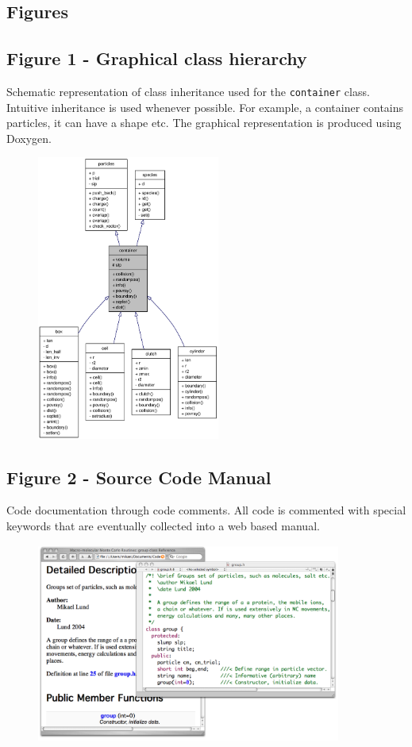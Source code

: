 \documentclass[10pt]{bmc_article}
\newenvironment{bmcformat}{\begin{raggedright}\baselineskip20pt\sloppy\setboolean{publ}{false}}{\end{raggedright}\baselineskip20pt\sloppy}
\begin{document}
\begin{bmcformat}

\section*{Figures}
  \subsection*{Figure 1 - Graphical class hierarchy}
      Schematic representation of class inheritance used for the
      \verb"container" class. Intuitive inheritance is used whenever possible.
      For example, a container contains particles, it can have a shape
      etc. The graphical representation is produced using Doxygen.
      \begin{figure}[ht]\center
      \includegraphics[width=6cm]{pics/container}
      \label{fig:container}
      \end{figure}

  \subsection*{Figure 2 - Source Code Manual}
      Code documentation through code comments. All code is commented with
      special keywords that are eventually collected into a web based manual.
      \begin{figure}[ht]\center
      \includegraphics[width=10cm]{pics/doxygen}
      \label{fig:doxygen}
      \end{figure}


\end{bmcformat}
\end{document}
